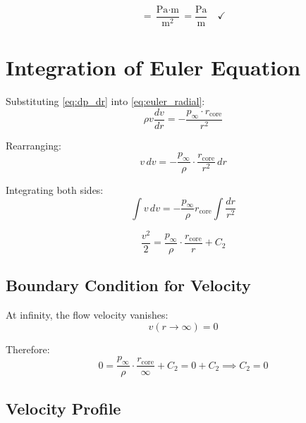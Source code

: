 \documentclass[12pt,a4paper,openany]{book}
\theoremstyle{definition}
\theoremstyle{plain}
\theoremstyle{remark}
\newcommand{\rcore}{r_{\text{core}}}       %
\newcommand{\pinfty}{p_\infty}             %
\begin{document}
\begin{dimcheckbox}
\begin{equation}
[\frac{dp}{dr}] = \frac{\text{Pa} \cdot \text{m}}{\text{m}^2} = \frac{\text{Pa}}{\text{m}} \quad \checkmark
\end{equation}
\end{dimcheckbox}

\section{Integration of Euler Equation}

Substituting \cref{eq:dp_dr} into \cref{eq:euler_radial}:
\begin{equation}
\rho v \frac{dv}{dr} = -\frac{\pinfty \cdot \rcore}{r^2}
\label{eq:euler_subst}
\end{equation}

Rearranging:
\begin{equation}
v\,dv = -\frac{\pinfty}{\rho} \cdot \frac{\rcore}{r^2}\,dr
\label{eq:v_dv}
\end{equation}

Integrating both sides:
\begin{equation}
\int v\,dv = -\frac{\pinfty}{\rho}\rcore \int \frac{dr}{r^2}
\label{eq:integration}
\end{equation}

\begin{equation}
\frac{v^2}{2} = \frac{\pinfty}{\rho} \cdot \frac{\rcore}{r} + C_2
\label{eq:v_squared_general}
\end{equation}

\subsection{Boundary Condition for Velocity}

At infinity, the flow velocity vanishes:
\begin{equation}
v(r \to \infty) = 0
\label{eq:v_bc}
\end{equation}

Therefore:
\begin{equation}
0 = \frac{\pinfty}{\rho} \cdot \frac{\rcore}{\infty} + C_2 = 0 + C_2 \implies C_2 = 0
\label{eq:C2_value}
\end{equation}

\subsection{Velocity Profile}
\end{document}
